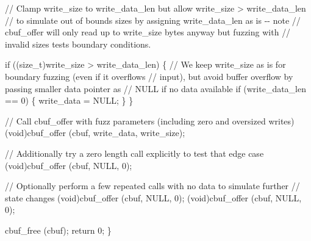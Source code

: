 \documentclass[
  a4paper,
]{scrreprt}
\newenvironment{Shaded}{\begin{snugshade}}{\end{snugshade}}
\newcommand{\CommentTok}[1]{\textcolor[rgb]{0.41,0.41,0.41}{#1}}
\newcommand{\ControlFlowTok}[1]{\textcolor[rgb]{0.85,0.12,0.09}{#1}}
\newcommand{\DataTypeTok}[1]{\textcolor[rgb]{0.47,0.16,0.63}{#1}}
\newcommand{\DecValTok}[1]{\textcolor[rgb]{0.47,0.16,0.63}{#1}}
\newcommand{\NormalTok}[1]{\textcolor[rgb]{0.33,0.33,0.33}{#1}}
\newcommand{\OperatorTok}[1]{\textcolor[rgb]{0.00,0.46,0.62}{#1}}
\theoremstyle{definition}
\theoremstyle{remark}
\begin{document}
\begin{Shaded}
\begin{Highlighting}[numbers=left,,]
  \CommentTok{// Clamp write\_size to write\_data\_len but allow write\_size \textgreater{} write\_data\_len}
  \CommentTok{// to simulate out of bounds sizes by assigning write\_data\_len as is {-}{-} note}
  \CommentTok{// cbuf\_offer will only read up to write\_size bytes anyway but fuzzing with}
  \CommentTok{// invalid sizes tests boundary conditions.}

  \ControlFlowTok{if} \OperatorTok{((}\DataTypeTok{size\_t}\OperatorTok{)}\NormalTok{write\_size }\OperatorTok{\textgreater{}}\NormalTok{ write\_data\_len}\OperatorTok{)}
    \OperatorTok{\{}
      \CommentTok{// We keep write\_size as is for boundary fuzzing (even if it overflows}
      \CommentTok{// input), but avoid buffer overflow by passing smaller data pointer as}
      \CommentTok{// NULL if no data available}
      \ControlFlowTok{if} \OperatorTok{(}\NormalTok{write\_data\_len }\OperatorTok{==} \DecValTok{0}\OperatorTok{)}
        \OperatorTok{\{}
\NormalTok{          write\_data }\OperatorTok{=}\NormalTok{ NULL}\OperatorTok{;}
        \OperatorTok{\}}
    \OperatorTok{\}}

  \CommentTok{// Call cbuf\_offer with fuzz parameters (including zero and oversized writes)}
  \OperatorTok{(}\DataTypeTok{void}\OperatorTok{)}\NormalTok{cbuf\_offer }\OperatorTok{(}\NormalTok{cbuf}\OperatorTok{,}\NormalTok{ write\_data}\OperatorTok{,}\NormalTok{ write\_size}\OperatorTok{);}

  \CommentTok{// Additionally try a zero length call explicitly to test that edge case}
  \OperatorTok{(}\DataTypeTok{void}\OperatorTok{)}\NormalTok{cbuf\_offer }\OperatorTok{(}\NormalTok{cbuf}\OperatorTok{,}\NormalTok{ NULL}\OperatorTok{,} \DecValTok{0}\OperatorTok{);}

  \CommentTok{// Optionally perform a few repeated calls with no data to simulate further}
  \CommentTok{// state changes}
  \OperatorTok{(}\DataTypeTok{void}\OperatorTok{)}\NormalTok{cbuf\_offer }\OperatorTok{(}\NormalTok{cbuf}\OperatorTok{,}\NormalTok{ NULL}\OperatorTok{,} \DecValTok{0}\OperatorTok{);}
  \OperatorTok{(}\DataTypeTok{void}\OperatorTok{)}\NormalTok{cbuf\_offer }\OperatorTok{(}\NormalTok{cbuf}\OperatorTok{,}\NormalTok{ NULL}\OperatorTok{,} \DecValTok{0}\OperatorTok{);}

\NormalTok{  cbuf\_free }\OperatorTok{(}\NormalTok{cbuf}\OperatorTok{);}
  \ControlFlowTok{return} \DecValTok{0}\OperatorTok{;}
\OperatorTok{\}}
\end{Highlighting}
\end{Shaded}
\end{document}
